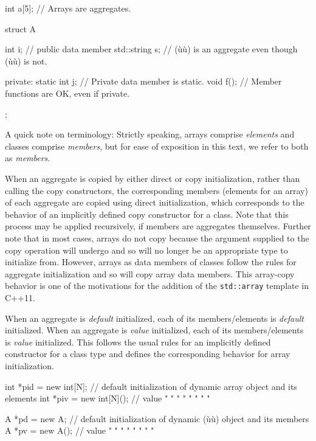 \begin{emcppslisting}
int a[5];           // Arrays are aggregates.

struct A
{
    int         i;  // public data member
    std::string s;  // (ù{}ù) is an aggregate even though (ù{}ù) is not.

private:
    static int j;   // Private data member is static.
    void f();       // Member functions are OK, even if private.
};
\end{emcppslisting}


\noindent A quick note on terminology: Strictly speaking, arrays comprise
\emph{elements} and classes comprise \emph{members}, but for ease of
exposition in this text, we refer to both as \emph{members}.

When an aggregate is copied by either direct or copy initialization,
rather than calling the copy constructors, the corresponding members
(elements for an array) of each aggregate are copied using direct
initialization, which corresponds to the behavior of an implicitly
defined copy constructor for a class. Note that this process may be
applied recursively, if members are aggregates themselves. Further note
that in most cases, arrays do not copy because the argument supplied to
the copy operation will undergo  and so
will no longer be an appropriate type to initialize from. However,
arrays as data members of classes follow the rules for aggregate
initialization and so will copy array data members. This array-copy
behavior is one of the motivations for the addition of the
\lstinline!std::array! template in C++11.

When an aggregate is \emph{default} initialized, each of its
members/elements is \emph{default} initialized. When an aggregate is
\emph{value} initialized, each of its members/elements is \emph{value}
initialized. This follows the usual rules for an implicitly defined
constructor for a class type and defines the corresponding behavior for
array initialization.

\begin{emcppslisting}
int *pid = new int[N];   // default initialization of dynamic array object and its elements
int *piv = new int[N](); // value        "         "     "      "     "     "   "     "

A *pd = new A;           // default initialization of dynamic (ù{}ù) object and its members
A *pv = new A();         // value        "         "     "     "    "     "   "     "
\end{emcppslisting}


